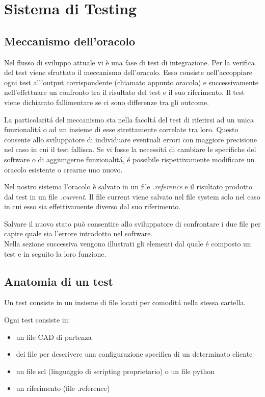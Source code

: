 \chapter{Sistema di Testing}
    \section{Meccanismo dell'oracolo\label{oracolo}}
        Nel flusso di sviluppo attuale vi è una fase di test di integrazione.
        Per la verifica del test viene sfruttato il meccanismo dell’oracolo.
        Esso consiste nell'accoppiare ogni test all'output corrispondente (chiamato appunto oracolo)
        e successivamente nell'effettuare un confronto tra il risultato del test e il suo riferimento.
        Il test viene dichiarato fallimentare se ci sono differenze tra gli outcome.
        
        La particolarit\'a del meccanismo sta nella facolt\'a del test di riferirsi ad un unica funzionalit\'a o ad un insieme di esse strettamente correlate tra loro.
        Questo consente allo sviluppatore di individuare eventuali errori con maggiore precisione nel caso in cui il test fallisca. 
        Se vi fosse la necessit\'a di cambiare le specifiche del software o di aggiungerne funzionalit\'a, \'e possibile rispettivamente modificare un oracolo esistente o crearne uno nuovo. 

        Nel nostro sistema l'oracolo è salvato in un file \textit{.reference} e il risultato prodotto
        dal test in un file \textit{.current}.
        Il file current viene salvato nel file system solo nel caso in cui esso sia effettivamente diverso dal suo riferimento.
        
        Salvare il nuovo stato può consentire allo sviluppatore di confrontare i due file per capire quale sia l'errore introdotto nel software. \\
        Nella sezione successiva vengono illustrati gli elementi dal quale \'e composto un test e in seguito la loro funzione.
    \section{Anatomia di un test\label{testanatomy}}
        Un test consiste in un insieme di file locati per comodit\'a nella stessa cartella. 

        Ogni test consiste in:
        \begin{itemize}
            \item un file CAD di partenza
            \item dei file per descrivere una configurazione specifica di un determinato cliente
            \item un file scl (linguaggio di scripting proprietario) o un file python
            \item un riferimento (file .reference)
        \end{itemize}
